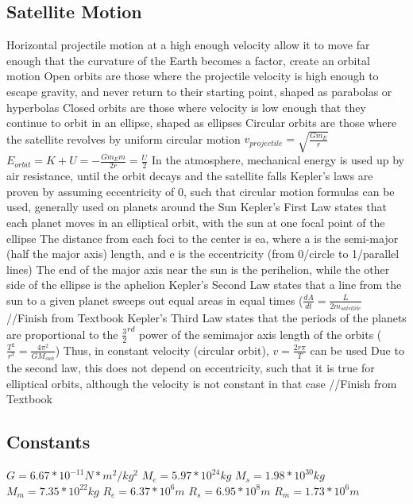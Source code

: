 \documentclass[11 pt, twoside]{article}
\newenvironment{outline*}
{
	\begin{outline}[enumerate]
	}
	{\end{outline}
}
\begin{document}
\subsection{Satellite Motion}
\begin{outline*}
\1 Horizontal projectile motion at a high enough velocity allow it to move far enough that the curvature of the Earth becomes a factor, create an orbital motion
\2 Open orbits are those where the projectile velocity is high enough to escape gravity, and never return to their starting point, shaped as parabolas or hyperbolas
\2 Closed orbits are those where velocity is low enough that they continue to orbit in an ellipse, shaped as ellipses
\1 Circular orbits are those where the satellite revolves by uniform circular motion
\2 $v_{projectile} = \sqrt{\frac{Gm_E}{r}}$
\2 $E_{orbit} = K + U = -\frac{Gm_Em}{2r} = \frac{U}{2}$
\2 In the atmosphere, mechanical energy is used up by air resistance, until the orbit decays and the satellite falls
\1 Kepler’s laws are proven by assuming eccentricity of 0, such that circular motion formulas can be used, generally used on planets around the Sun
\1 Kepler’s First Law states that each planet moves in an elliptical orbit, with the sun at one focal point of the ellipse
\2 The distance from each foci to the center is ea, where a is the semi-major (half the major axis) length, and e is the eccentricity (from 0/circle to 1/parallel lines)
\2 The end of the major axis near the sun is the perihelion, while the other side of the ellipse is the aphelion
\1 Kepler’s Second Law states that a line from the sun to a given planet sweeps out equal areas in equal times ($\frac{dA}{dt} = \frac{L}{2m_{satellite}}$ 
\2 //Finish from Textbook
\1 Kepler’s Third Law states that the periods of the planets are proportional to the $\frac{3}{2}^{rd}$ power of the semimajor axis length of the orbits ($\frac{T^2}{r^3} = \frac{4\pi^2}{GM_{sun}}$)
\2 Thus, in constant velocity (circular orbit), $v = \frac{2r\pi}{T}$ can be used
\2 Due to the second law, this does not depend on eccentricity, such that it is true for elliptical orbits, although the velocity is not constant in that case
\1 //Finish from Textbook
\end{outline*}
\subsection{Constants}
\begin{outline*}
\1 $G = 6.67 * 10^{-11} N*m^2/kg^2$
\1 $M_e = 5.97 * 10^{24} kg$
\1 $M_s = 1.98 * 10^{30} kg$
\1 $M_m = 7.35 * 10^{22} kg$
\1 $R_e = 6.37 * 10^6 m$
\1 $R_s = 6.95 * 10^8 m$
\1 $R_m = 1.73 * 10^6 m$
\end{outline*}
\end{document}
